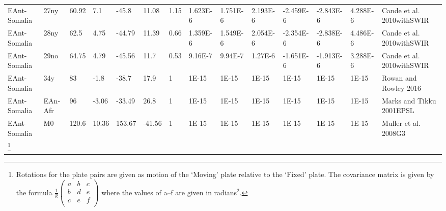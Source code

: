 \begin{landscape}
\begin{longtable}{@{}lllllllllllllp{3.5cm}@{}}
EAnt-Somalia & 27ny & 60.92 & 7.1 & -45.8 & 11.08 & 1.15 & 1.623E-6 & 1.751E-6 & 2.193E-6 & -2.459E-6 & -2.843E-6 & 4.288E-6 & Cande et al. 2010withSWIR \\
EAnt-Somalia & 28ny & 62.5 & 4.75 & -44.79 & 11.39 & 0.66 & 1.359E-6 & 1.549E-6 & 2.054E-6 & -2.354E-6 & -2.838E-6 & 4.486E-6 & Cande et al. 2010withSWIR \\
EAnt-Somalia & 29no & 64.75 & 4.79 & -45.56 & 11.7 & 0.53 & 9.16E-7 & 9.94E-7 & 1.27E-6 & -1.651E-6 & -1.913E-6 & 3.288E-6 & Cande et al. 2010withSWIR \\
EAnt-Somalia & 34y & 83 & -1.8 & -38.7 & 17.9 & 1 & 1E-15 & 1E-15 & 1E-15 & 1E-15 & 1E-15 & 1E-15 & Rowan and Rowley 2016 \\
EAnt-Somalia & EAn-Afr & 96 & -3.06 & -33.49 & 26.8 & 1 & 1E-15 & 1E-15 & 1E-15 & 1E-15 & 1E-15 & 1E-15 & Marks and Tikku 2001EPSL \\
EAnt-Somalia & M0 & 120.6 & 10.36 & 153.67 & -41.56 & 1 & 1E-15 & 1E-15 & 1E-15
& 1E-15 & 1E-15 & 1E-15 & Muller et al. 2008G3 \\* \bottomrule\let\thefootnote\relax\footnote{Rotations for the plate pairs are given as motion of the
`Moving' plate relative to the `Fixed' plate. The covariance matrix is given by
the formula $\frac{1}{\hat{\kappa}}\left( {\begin{array}{ccc}
   a & b & c\\
   b & d & e\\
   c & e & f\\ \end{array}} \right)$ where the values of a–f are given in radians$^2$.}
\end{longtable}
\end{landscape}

